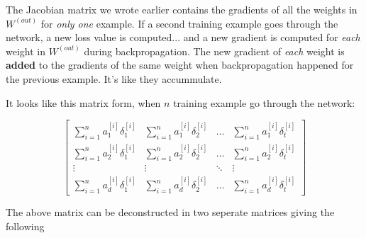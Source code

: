 \documentclass[../main.tex]{subfiles}
\begin{document}
The Jacobian matrix we wrote earlier contains the gradients of all the
weights in $W^{(out)}$ for \emph{only one} example. If a second training example goes 
through the network, a new loss value is computed...  and a new gradient is computed
for \emph{each} weight in $W^{(out)}$ during backpropagation. The new gradient of \emph{each} weight
is \textbf{added} to the gradients of the same weight when backpropagation happened for the previous example.
It's like they accummulate.

\vspace{5mm} %

It looks like this matrix form, when $n$ training example go through the network:

\[
    \begin{bmatrix}
        \sum_{i=1}^{n} a_1^{[i]}\delta_1^{[i]}  & \sum_{i=1}^{n} a_1^{[i]}\delta_2^{[i]} & \dots    & \sum_{i=1}^{n} a_1^{[i]}\delta_t^{[i]} \\
        \sum_{i=1}^{n} a_2^{[i]}\delta_1^{[i]}  & \sum_{i=1}^{n} a_2^{[i]}\delta_2^{[i]} & \dots    & \sum_{i=1}^{n} a_2^{[i]}\delta_t^{[i]} \\
        \vdots                                  & \vdots                                 & \ddots   & \vdots                                 \\
        \sum_{i=1}^{n} a_d^{[i]}\delta_1^{[i]}  & \sum_{i=1}^{n} a_d^{[i]}\delta_2^{[i]} & \dots    & \sum_{i=1}^{n} a_d^{[i]}\delta_t^{[i]}
    \end{bmatrix}
\]

\vspace{5mm} %

The above matrix can be deconstructed in two seperate matrices giving the following
\end{document}
